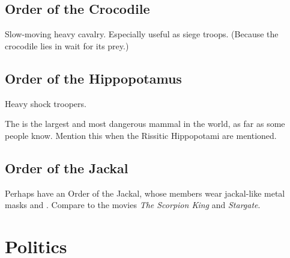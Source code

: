 \subsection{Order of the Crocodile}
Slow-moving heavy cavalry. 
Especially useful as siege troops. 
(Because the crocodile lies in wait for its prey.)





\subsection{Order of the Hippopotamus}
Heavy shock troopers. 

The  is the largest and most dangerous mammal in the world, as far as some people know.
Mention this when the Rissitic Hippopotami are mentioned.






\subsection{Order of the Jackal}
Perhaps have an Order of the Jackal, whose members wear jackal-like metal masks and \armour. Compare to the movies \emph{The Scorpion King} and \emph{Stargate}. 
















\section{Politics}




